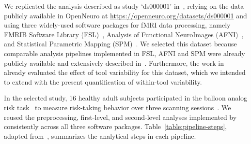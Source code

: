 We replicated the analysis described as study `ds000001'
in~\cite{schonberg2012decreasing}, relying on the data publicly available
in OpenNeuro at \url{https://openneuro.org/datasets/ds000001} and using
three widely-used software packages for fMRI data processing, namely FMRIB
Software Library (FSL)~\cite{jenkinson2012fsl}, Analysis of Functional
NeuroImages (AFNI)~\cite{cox1996afni}, and Statistical Parametric
Mapping (SPM)~\cite{penny2011statistical}. We selected this dataset because
comparable analysis pipelines implemented in FSL, AFNI and SPM were already
publicly available and extensively described in~\cite{bowring2019exploring}.
Furthermore, the work in~\cite{bowring2019exploring} already evaluated the
effect of tool variability for this dataset, which we intended to
extend with the present quantification of within-tool variability.

In the selected study, 16 healthy adult subjects participated in the
balloon analog risk task~\cite{lejuez2002evaluation} to measure risk-taking
behavior over three scanning sessions~\cite{schonberg2012decreasing}. We
reused the preprocessing, first-level, and second-level analyses
implemented by~\cite{bowring2019exploring} consistently across all three
software packages. Table~\ref{table:pipeline-steps}, adapted from~\cite{bowring2019exploring},
summarizes the analytical steps in each
pipeline.

